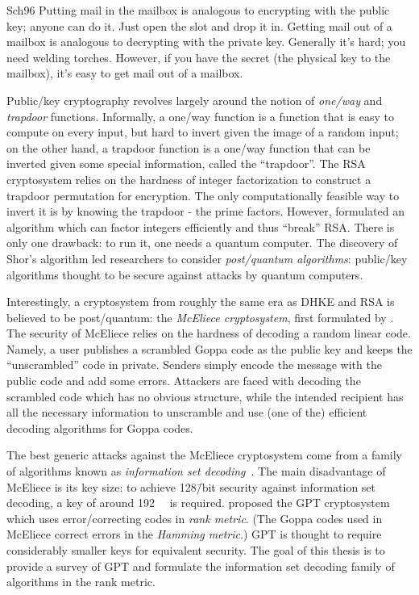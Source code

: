 \documentclass[version=last, paper=A4, parskip=half, oneside,%
toc=bibliography, toc=listof, listof=leveldown]{scrbook}
\theoremstyle{plain}
\theoremstyle{definition}
\theoremstyle{remark}
\begin{document}
\begin{displaycquote}{Sch96}
  Putting mail in the mailbox is analogous to encrypting with the public key;
  anyone can do it.  Just open the slot and drop it in.  Getting mail out of a
  mailbox is analogous to decrypting with the private key.  Generally it's hard;
  you need welding torches.  However, if you have the secret (the physical key
  to the mailbox), it's easy to get mail out of a mailbox.
\end{displaycquote}

Public\-/key cryptography revolves largely around the notion of \emph{one\-/way}
and \emph{trapdoor} functions.  Informally, a one\-/way function is a function
that is easy to compute on every input, but hard to invert given the image of a
random input; on the other hand, a trapdoor function is a one\-/way function
that can be inverted given some special information, called the
\enquote{trapdoor}.  The RSA cryptosystem relies on the hardness of integer
factorization to construct a trapdoor permutation for encryption.  The only
computationally feasible way to invert it is by knowing the trapdoor \--{} the
prime factors.  However, \textcite{Sho97} formulated an algorithm which can
factor integers efficiently and thus \enquote{break} RSA\@.  There is only one
drawback: to run it, one needs a quantum computer.  The discovery of Shor's
algorithm led researchers to consider \emph{post\-/quantum algorithms}:
public\-/key algorithms thought to be secure against attacks by quantum
computers.

Interestingly, a cryptosystem from roughly the same era as DHKE and RSA is
believed to be post\-/quantum: the \emph{McEliece cryptosystem}, first
formulated by \textcite{Eli78}.  The security of McEliece relies on the hardness
of decoding a random linear code.  Namely, a user publishes a scrambled Goppa
code as the public key and keeps the \enquote{unscrambled} code in private.
Senders simply encode the message with the public code and add some errors.
Attackers are faced with decoding the scrambled code which has no obvious
structure, while the intended recipient has all the necessary information to
unscramble and use (one of the) efficient decoding algorithms for Goppa codes.

The best generic attacks against the McEliece cryptosystem come from a family
of algorithms known as \emph{information set decoding}~\cite{B+12}.  The main
disadvantage of McEliece is its key size: to achieve \num{128}\=/bit security
against information set decoding, a key of around \SI{192}{\kilo\byte} is
required.  \Textcite{GPT91} proposed the GPT cryptosystem which uses
error\-/correcting codes in \emph{rank metric}.  (The Goppa codes used in
McEliece correct errors in the \emph{Hamming metric}.)  GPT is thought to
require considerably smaller keys for equivalent security.  The goal of this
thesis is to provide a survey of GPT and formulate the information set decoding
family of algorithms in the rank metric.
\end{document}
